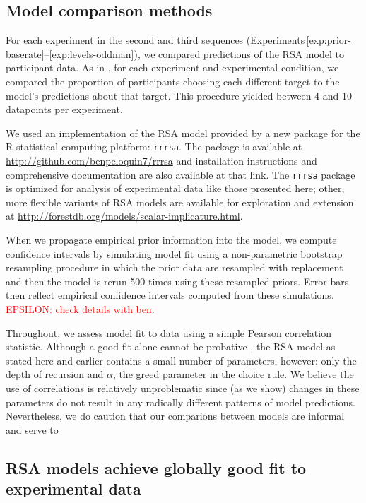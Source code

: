 \documentclass[man,noapacite]{apa2}
\newcommand{\red}[1]{\textcolor{red}{#1}}
\newcounter{Experiment}
\newcommand{\exptrefrange}[2]{Experiments\,\ref{#1}--\ref{#2}}
\begin{document}
\subsection{Model comparison methods}

For each experiment in the second and third sequences (\exptrefrange{exp:prior-baserate}{exp:levels-oddman}), we compared predictions of the RSA model to participant data. As in , for each experiment and experimental condition, we compared the proportion of participants choosing each different target to the model's predictions about that target. This procedure yielded between 4 and 10 datapoints per experiment.

We used an implementation of the RSA model provided by a new package for the R statistical computing platform: \texttt{rrrsa}. The package is available at \url{http://github.com/benpeloquin7/rrrsa} and installation instructions and comprehensive documentation are also available at that link. The \texttt{rrrsa} package is optimized for analysis of experimental data like those presented here; other, more flexible variants of RSA models are available for exploration and extension at \url{http://forestdb.org/models/scalar-implicature.html}.

When we propagate empirical  prior information into the model, we compute confidence intervals by simulating model fit using a non-parametric bootstrap resampling procedure in which the prior data are resampled with replacement and then the model is rerun 500 times using these resampled priors. Error bars then reflect empirical confidence intervals computed from these simulations. \red{EPSILON: check details with ben}.

Throughout, we assess model fit to data using a simple Pearson correlation statistic. Although a good fit alone cannot be probative \cite{roberts2000}, the RSA model as stated here and earlier contains a  small number of parameters, however: only the depth of recursion and $\alpha$, the greed parameter in the choice rule. We believe the use of correlations is relatively unproblematic since (as we show) changes in these parameters do not result in any radically different patterns of model predictions. Nevertheless, we do caution that our comparions between models are informal and serve to


\subsection{RSA models achieve globally good fit to experimental data}
\end{document}
